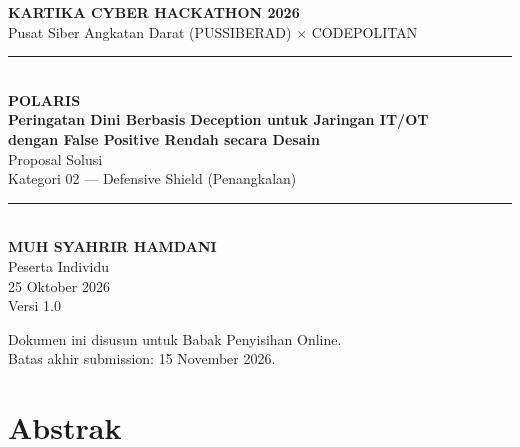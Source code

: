 \documentclass[12pt,a4paper]{article}
\begin{document}
\begin{titlepage}
\thispagestyle{empty}
\centering
\vspace*{1.0cm}

{\footnotesize\bfseries\color{slate} KARTIKA CYBER HACKATHON 2026}\\[0.15cm]
{\footnotesize\color{slate} Pusat Siber Angkatan Darat (PUSSIBERAD) \(\times\) CODEPOLITAN}\\[1.4cm]

\textcolor{navy}{\rule{\textwidth}{0.8pt}}\\[0.7cm]

{\LARGE\bfseries\color{navy} POLARIS}\\[0.35cm]
{\Large\bfseries Peringatan Dini Berbasis Deception untuk Jaringan IT/OT\\[0.15cm]
dengan False Positive Rendah secara Desain}\\[0.7cm]

{\large Proposal Solusi}\\[0.25cm]
{\large Kategori 02 --- Defensive Shield (Penangkalan)}\\[0.7cm]

\textcolor{navy}{\rule{\textwidth}{0.8pt}}\\[1.3cm]

{\large\bfseries MUH SYAHRIR HAMDANI}\\[0.2cm]
{\normalsize Peserta Individu}\\[1.4cm]

{\normalsize 25 Oktober 2026}\\[0.25cm]
{\small Versi 1.0}

\vfill
{\footnotesize Dokumen ini disusun untuk Babak Penyisihan Online.}\\[0.1cm]
{\footnotesize Batas akhir submission: 15 November 2026.}
\end{titlepage}

\section*{Abstrak}
\end{document}
